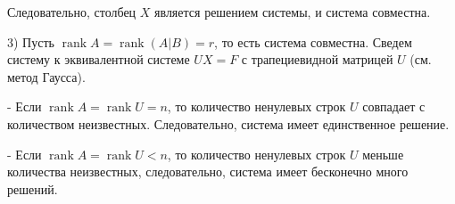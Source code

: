 {Следовательно, столбец \( X \) является решением системы, и система совместна.

3) Пусть \( \operatorname{rank} A = \operatorname{rank} (A|B) = r \), то есть система совместна. Сведем систему к эквивалентной системе \( UX = F \) с трапециевидной матрицей \( U \) (см. метод Гаусса).

- Если \( \operatorname{rank} A = \operatorname{rank} U = n \), то количество ненулевых строк \( U \) совпадает с количеством неизвестных. Следовательно, система имеет единственное решение.

- Если \( \operatorname{rank} A = \operatorname{rank} U < n \), то количество ненулевых строк \( U \) меньше количества неизвестных, следовательно, система имеет бесконечно много решений.


}